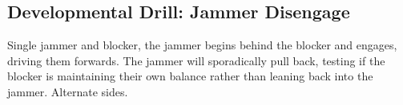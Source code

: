 \subsection*{Developmental Drill: Jammer Disengage}
\label{drill:one_on_one/developmental/jammer_disengage}

Single jammer and blocker, the jammer begins behind the blocker and engages, driving them forwards.
The jammer will sporadically pull back, testing if the blocker is maintaining their own balance rather than leaning back into the jammer. 
Alternate sides.

